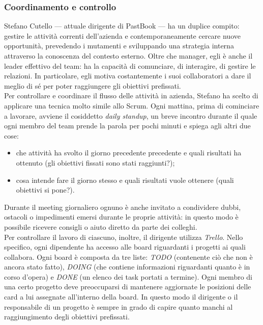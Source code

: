 			\subsubsection{Coordinamento e controllo}
				Stefano Cutello — attuale dirigente di PastBook — ha un duplice compito: gestire le attività correnti dell'azienda e
				contemporaneamente cercare nuove opportunità, prevedendo i mutamenti e sviluppando una strategia interna attraverso
				la conoscenza del contesto esterno. Oltre che manager, egli è anche il leader effettivo del team: ha la capacità di
				comunciare, di interagire, di gestire le relazioni. In particolare, egli motiva costantemente i suoi collaboratori a
				dare il meglio di sé per poter raggiungere gli obiettivi prefissati.\\
				Per controllare e coordinare il flusso delle attività in azienda, Stefano ha scelto di applicare una tecnica molto
				simile allo Scrum. Ogni mattina, prima di cominciare a lavorare, avviene il cosiddetto \emph{daily standup}, un
				breve incontro durante il quale ogni membro del team prende la parola per pochi minuti e spiega agli altri due cose:
				\begin{itemize}
					\item che attività ha svolto il giorno precedente precedente e quali risultati ha ottenuto (gli obiettivi
					fissati sono stati raggiunti?);
					\item cosa intende fare il giorno stesso e quali risultati vuole ottenere (quali obiettivi si pone?).
				\end{itemize}
				Durante il meeting giornaliero ognuno è anche invitato a condividere dubbi, ostacoli o impedimenti emersi durante le
				proprie attività: in questo modo è possibile ricevere consigli o aiuto diretto da parte dei colleghi.\\
				Per controllare il lavoro di ciascuno, inoltre, il dirigente utilizza
				\emph{Trello}. Nello specifico, ogni dipendente ha accesso alle board riguardanti
				i progetti ai quali collabora. Ogni board è composta da tre liste: \emph{TODO} (contenente ciò che non è ancora
				stato fatto), \emph{DOING} (che contiene informazioni riguardanti quanto è in corso d'opera) e \emph{DONE} (un
				elenco dei task portati a termine). Ogni membro di una certo progetto deve preoccuparsi di mantenere aggiornate le
				posizioni delle card a lui assegnate all'interno della board. In questo modo il dirigente o il responsabile di un
				progetto è sempre in grado di capire quanto manchi al raggiungimento degli obiettivi prefissati.\\
